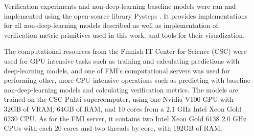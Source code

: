 Verification experiments and non-deep-learning baseline models were ran and implemented using the open-source library Pysteps \cite{pulkkinen_pysteps_2019}. It provides implementations for all non-deep-learning models described as well as implementation of verification metric primitives used in this work, and tools for their visualization. 

The computational resources from the Finnish IT Center for Science (CSC) were used for GPU intensive tasks such as training and calculating predictions with deep-learning models, and one of FMI's computational servers was used for performing other, more CPU-intensive operations such as predicting with baseline non-deep-learning models and calculating verification metrics. The models are trained on the CSC Puhti supercomputer, using one Nvidia V100 GPU with 32GB of VRAM, 64GB of RAM, and 10 cores from a 2.1 GHz Intel Xeon Gold 6230 CPU. As for the FMI server, it contains two Intel Xeon Gold 6138 2.0 GHz CPUs with each 20 cores and two threads by core, with 192GB of RAM. 

